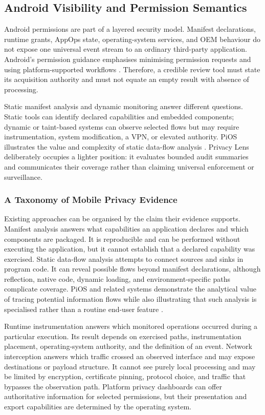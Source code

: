 \subsection{Android Visibility and Permission Semantics}

Android permissions are part of a layered security model. Manifest declarations, runtime grants, AppOps state, operating-system services, and OEM behaviour do not expose one universal event stream to an ordinary third-party application. Android's permission guidance emphasises minimising permission requests and using platform-supported workflows \cite{androidpermissions2026}. Therefore, a credible review tool must state its acquisition authority and must not equate an empty result with absence of processing.

Static manifest analysis and dynamic monitoring answer different questions. Static tools can identify declared capabilities and embedded components; dynamic or taint-based systems can observe selected flows but may require instrumentation, system modification, a VPN, or elevated authority. PiOS illustrates the value and complexity of static data-flow analysis \cite{49}. Privacy Lens deliberately occupies a lighter position: it evaluates bounded audit summaries and communicates their coverage rather than claiming universal enforcement or surveillance.

\subsubsection{A Taxonomy of Mobile Privacy Evidence}

Existing approaches can be organised by the claim their evidence supports. Manifest analysis answers what capabilities an application declares and which components are packaged. It is reproducible and can be performed without executing the application, but it cannot establish that a declared capability was exercised. Static data-flow analysis attempts to connect sources and sinks in program code. It can reveal possible flows beyond manifest declarations, although reflection, native code, dynamic loading, and environment-specific paths complicate coverage. PiOS and related systems demonstrate the analytical value of tracing potential information flows while also illustrating that such analysis is specialised rather than a routine end-user feature \cite{49}.

Runtime instrumentation answers which monitored operations occurred during a particular execution. Its result depends on exercised paths, instrumentation placement, operating-system authority, and the definition of an event. Network interception answers which traffic crossed an observed interface and may expose destinations or payload structure. It cannot see purely local processing and may be limited by encryption, certificate pinning, protocol choice, and traffic that bypasses the observation path. Platform privacy dashboards can offer authoritative information for selected permissions, but their presentation and export capabilities are determined by the operating system.

